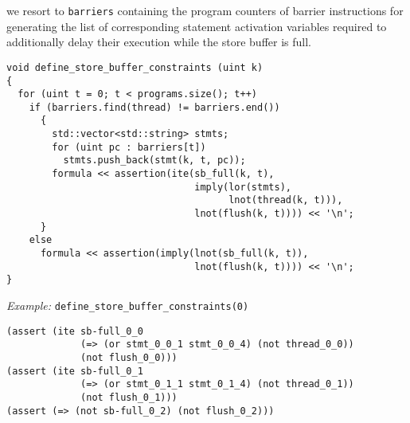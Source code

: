 we resort to \texttt{barriers} containing the program counters of barrier instructions for generating the list of corresponding statement activation variables required to additionally delay their execution while the store buffer is full.

\newpage

\begin{lstlisting}[style=c++]
void define_store_buffer_constraints (uint k)
{
  for (uint t = 0; t < programs.size(); t++)
    if (barriers.find(thread) != barriers.end())
      {
        std::vector<std::string> stmts;
        for (uint pc : barriers[t])
          stmts.push_back(stmt(k, t, pc));
        formula << assertion(ite(sb_full(k, t),
                                 imply(lor(stmts),
                                       lnot(thread(k, t))),
                                 lnot(flush(k, t)))) << '\n';
      }
    else
      formula << assertion(imply(lnot(sb_full(k, t)),
                                 lnot(flush(k, t)))) << '\n';
}
\end{lstlisting}

\noindent
\emph{Example:} \lstinline[style=c++]{define_store_buffer_constraints(0)}


\begin{lstlisting}[language=SMTLib]
(assert (ite sb-full_0_0
             (=> (or stmt_0_0_1 stmt_0_0_4) (not thread_0_0))
             (not flush_0_0)))
(assert (ite sb-full_0_1
             (=> (or stmt_0_1_1 stmt_0_1_4) (not thread_0_1))
             (not flush_0_1)))
(assert (=> (not sb-full_0_2) (not flush_0_2)))
\end{lstlisting}

